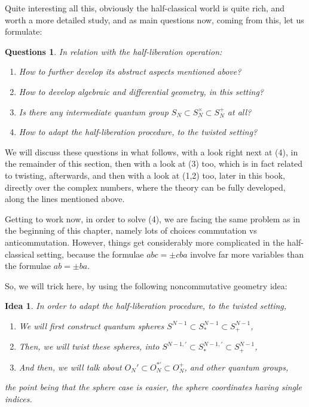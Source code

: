 \documentclass[12pt]{amsbook}
\newtheorem{idea}[theorem]{Idea}
\newtheorem{questions}[theorem]{Questions}
\begin{document}
Quite interesting all this, obviously the half-classical world is quite rich, and worth a more detailed study, and as main questions now, coming from this, let us formulate:

\begin{questions}
In relation with the half-liberation operation:
\begin{enumerate}
\item How to further develop its abstract aspects mentioned above?

\item How to develop algebraic and differential geometry, in this setting?

\item Is there any intermediate quantum group $S_N\subset S_N^\times\subset S_N^+$ at all?

\item How to adapt the half-liberation procedure, to the twisted setting?
\end{enumerate}
\end{questions}

We will discuss these questions in what follows, with a look right next at (4), in the remainder of this section, then with a look at (3) too, which is in fact related to twisting, afterwards, and then with a look at (1,2) too, later in this book, directly over the complex numbers, where the theory can be fully developed, along the lines mentioned above.

\bigskip

Getting to work now, in order to solve (4), we are facing the same problem as in the beginning of this chapter, namely lots of choices commutation vs anticommutation. However, things get considerably more complicated in the half-classical setting, because the formulae $abc=\pm cba$ involve far more variables than the formulae $ab=\pm ba$.

\bigskip

So, we will trick here, by using the following noncommutative geometry idea:

\begin{idea}
In order to adapt the half-liberation procedure, to the twisted setting,
\begin{enumerate}
\item We will first construct quantum spheres $S^{N-1}\subset S^{N-1}_*\subset S^{N-1}_+$,

\item Then, we will twist these spheres, into $S^{N-1,\prime}\subset S^{N-1,\prime}_*\subset S^{N-1}_+$,

\item And then, we will talk about $O_N'\subset O_N^{*\prime}\subset O_N^+$, and other quantum groups,
\end{enumerate}
the point being that the sphere case is easier, the sphere coordinates having single indices.
\end{idea}
\end{document}
